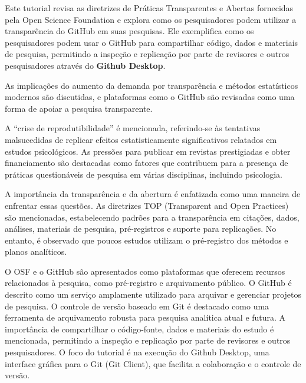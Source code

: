 \documentclass[
  a4paper,
]{article}
\begin{document}
\begin{tcolorbox}[enhanced jigsaw, breakable, opacityback=0, left=2mm, colbacktitle=quarto-callout-note-color!10!white, colframe=quarto-callout-note-color-frame, coltitle=black, title=\textcolor{quarto-callout-note-color}{\faInfo}\hspace{0.5em}{@gilroy2019 \emph{Reading Note} (Tip~\ref{tip-prompt})}, titlerule=0mm, leftrule=.75mm, arc=.35mm, colback=white, bottomtitle=1mm, toptitle=1mm, toprule=.15mm, bottomrule=.15mm, rightrule=.15mm, opacitybacktitle=0.6]

Este tutorial revisa as diretrizes de Práticas Transparentes e Abertas
fornecidas pela Open Science Foundation e explora como os pesquisadores
podem utilizar a transparência do GitHub em suas pesquisas. Ele
exemplifica como os pesquisadores podem usar o GitHub para compartilhar
código, dados e materiais de pesquisa, permitindo a inspeção e
replicação por parte de revisores e outros pesquisadores através do
\textbf{Github Desktop}.

As implicações do aumento da demanda por transparência e métodos
estatísticos modernos são discutidas, e plataformas como o GitHub são
revisadas como uma forma de apoiar a pesquisa transparente.

A ``crise de reprodutibilidade'' é mencionada, referindo-se às
tentativas malsucedidas de replicar efeitos estatisticamente
significativos relatados em estudos psicológicos. As pressões para
publicar em revistas prestigiadas e obter financiamento são destacadas
como fatores que contribuem para a presença de práticas questionáveis de
pesquisa em várias disciplinas, incluindo psicologia.

A importância da transparência e da abertura é enfatizada como uma
maneira de enfrentar essas questões. As diretrizes TOP (Transparent and
Open Practices) são mencionadas, estabelecendo padrões para a
transparência em citações, dados, análises, materiais de pesquisa,
pré-registros e suporte para replicações. No entanto, é observado que
poucos estudos utilizam o pré-registro dos métodos e planos analíticos.

O OSF e o GitHub são apresentados como plataformas que oferecem recursos
relacionados à pesquisa, como pré-registro e arquivamento público. O
GitHub é descrito como um serviço amplamente utilizado para arquivar e
gerenciar projetos de pesquisa. O controle de versão baseado em Git é
destacado como uma ferramenta de arquivamento robusta para pesquisa
analítica atual e futura. A importância de compartilhar o código-fonte,
dados e materiais do estudo é mencionada, permitindo a inspeção e
replicação por parte de revisores e outros pesquisadores. O foco do
tutorial é na execução do Github Desktop, uma interface gráfica para o
Git (Git Client), que facilita a colaboração e o controle de versão.


\end{tcolorbox}
\end{document}
